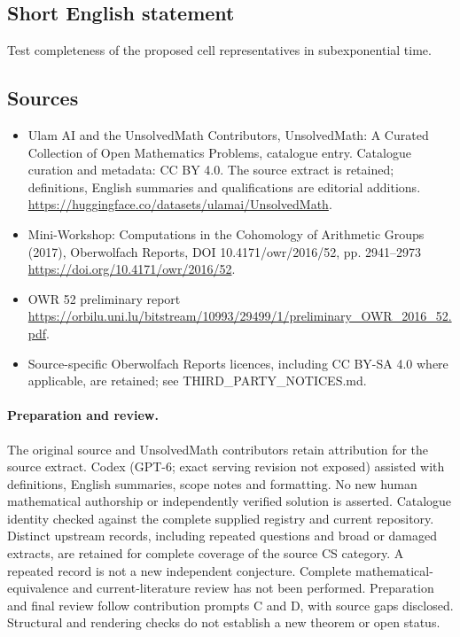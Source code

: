 \documentclass[11pt]{article}
\begin{document}
\subsection{Short English statement}
Test completeness of the proposed cell representatives in subexponential time.
\subsection{Sources}
\begin{itemize}
\item[\hypertarget{source:statement:1}{S1}] Ulam AI and the UnsolvedMath Contributors, UnsolvedMath: A Curated Collection of Open Mathematics Problems, catalogue entry. Catalogue curation and metadata: CC BY 4.0. The source extract is retained; definitions, English summaries and qualifications are editorial additions.
\url{https://huggingface.co/datasets/ulamai/UnsolvedMath}.
\item[\hypertarget{source:statement:2}{S2}] Mini-Workshop: Computations in the Cohomology of Arithmetic Groups (2017), Oberwolfach Reports, DOI 10.4171/owr/2016/52, pp. 2941--2973
\url{https://doi.org/10.4171/owr/2016/52}.
\item[\hypertarget{source:statement:3}{S3}] OWR 52 preliminary report
\url{https://orbilu.uni.lu/bitstream/10993/29499/1/preliminary_OWR_2016_52.pdf}.
\item Source-specific Oberwolfach Reports licences, including CC BY-SA 4.0 where applicable, are retained; see THIRD\_PARTY\_NOTICES.md.
\end{itemize}
\paragraph{Preparation and review.}
The original source and UnsolvedMath contributors retain attribution for the source extract. Codex (GPT-6; exact serving revision not exposed) assisted with definitions, English summaries, scope notes and formatting. No new human mathematical authorship or independently verified solution is asserted. Catalogue identity checked against the complete supplied registry and current repository. Distinct upstream records, including repeated questions and broad or damaged extracts, are retained for complete coverage of the source CS category. A repeated record is not a new independent conjecture. Complete mathematical-equivalence and current-literature review has not been performed. Preparation and final review follow contribution prompts C and D, with source gaps disclosed. Structural and rendering checks do not establish a new theorem or open status.
\label{end:statement}
\end{document}
